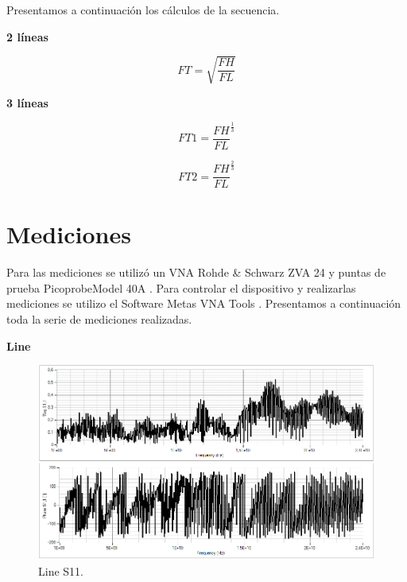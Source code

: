 \documentclass[10pt, a4paper, twocolumn]{article}
\begin{document}
Presentamos a continuación los cálculos de la secuencia.

\textbf{2 líneas} \newline

\large
\begin{equation}
\boxed{ FT = \sqrt{\frac{FH}{FL}} }
\end{equation}
\normalsize

\textbf{3 líneas} \newline

\large
\begin{equation}
\boxed{ FT1 = \frac{FH}{FL}^\frac{1}{3} }
\end{equation}
\normalsize

\large
\begin{equation}
\boxed{ FT2 = \frac{FH}{FL}^\frac{2}{3} }
\end{equation}
\normalsize

\section{Mediciones}

Para las mediciones se utilizó un VNA Rohde \& Schwarz ZVA 24 \cite{vna} y puntas
de prueba Picoprobe\textregistered Model 40A \cite{probe}. Para controlar el dispositivo
y realizarlas mediciones se utilizo el Software Metas VNA Tools \cite{metas}. Presentamos a continuación
toda la serie de mediciones realizadas. \newline

\textbf{Line} \newline

\begin{figure}[hbt!]
	\includegraphics[width=\linewidth]{Fotos/Mediciones/L1_S11_No.PNG}
	\caption{Line S11.}
\end{figure}
\end{document}
